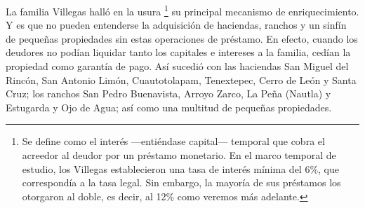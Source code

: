 \documentclass[14pt,twoside,final]{extbook} %
\let\oldfootnote\footnote
\renewcommand\footnote[1]{%
\oldfootnote{\hspace{1mm}#1}}
\begin{document}
La familia Villegas halló en la usura\footnote{Se define como el interés ---entiéndase capital--- temporal que cobra el acreedor al deudor por un préstamo monetario. En el marco temporal de estudio, los Villegas\index[nombres]{Villegas!familia} establecieron una tasa de interés mínima del 6\%, que correspondía a la tasa legal. Sin embargo, la mayoría de sus préstamos los otorgaron al doble, es decir, al 12\% como veremos más adelante.} su principal mecanismo de enriquecimiento. Y es que no pueden entenderse la adquisición de haciendas, ranchos y un sinfín de pequeñas propiedades sin estas operaciones de préstamo. En efecto, cuando los deudores no podían liquidar tanto los capitales e intereses a la familia, cedían la propiedad como garantía de pago. Así sucedió con las haciendas San Miguel del Rincón, San Antonio Limón, Cuautotolapam, Tenextepec, Cerro de León y Santa Cruz; los ranchos San Pedro Buenavista, Arroyo Zarco, La Peña (Nautla) y Estugarda y Ojo de Agua; así como una multitud de pequeñas propiedades.\protect\enlargethispage*{\baselineskip}
\end{document}
